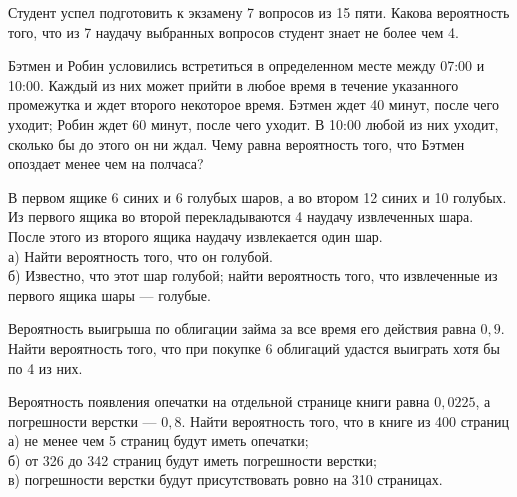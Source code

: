 \newpage\setcounter{zad}{0}



\begin{zkrW}{20}\noindent 
	Студент успел подготовить к экзамену 7 вопросов из 15 пяти. Какова вероятность того, что из 7 наудачу выбранных вопросов студент знает не более чем 4.
 
\end{zkrW}

\begin{zkrW}{20}\noindent 
	Бэтмен и Робин условились встретиться в определенном месте между 07:00 и 10:00. Каждый из них может прийти в любое время в течение указанного промежутка и ждет второго некоторое время. Бэтмен ждет 40 минут, после чего уходит; Робин ждет 60 минут, после чего уходит. В 10:00 любой из них уходит, сколько бы до этого он ни ждал. Чему равна вероятность того, что Бэтмен опоздает менее чем на полчаса?
 
\end{zkrW}

\begin{zkrW}{20}\noindent 
	В первом ящике 6 синих и 6 голубых шаров, а во втором 12 синих и 10 голубых. Из первого ящика во второй перекладываются 4 наудачу извлеченных шара. После этого из второго ящика наудачу извлекается один шар. \\ \indent а) Найти вероятность того, что он голубой. \\ \indent б) Известно, что этот шар голубой; найти вероятность того, что извлеченные из первого ящика шары --- голубые.
 
\end{zkrW}

\begin{zkrW}{20}\noindent 
	Вероятность выигрыша по облигации займа за все время его действия равна $0{,}9$. Найти вероятность того, что при покупке 6 облигаций удастся выиграть хотя бы по 4 из них.
 
\end{zkrW}

\begin{zkrW}{20}\noindent 
	Вероятность появления опечатки на отдельной странице книги равна $0{,}0225$, а погрешности верстки --- $0{,}8$. Найти вероятность того, что в книге из 400 страниц \\ \indent а) не менее чем 5 страниц будут иметь опечатки; \\ \indent б) от 326 до 342 страниц будут иметь погрешности верстки; \\ \indent в) погрешности верстки будут присутствовать ровно на 310 страницах.
 
\end{zkrW}

